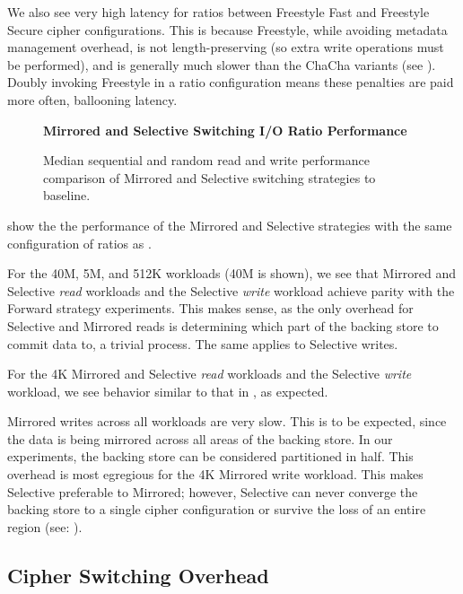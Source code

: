 We also see very high latency for ratios between Freestyle Fast and Freestyle
Secure cipher configurations. This is because Freestyle, while avoiding metadata
management overhead, is not length-preserving (so extra write operations must be
performed), and is generally much slower than the ChaCha variants (see
). Doubly invoking Freestyle in a ratio configuration
means these penalties are paid more often, ballooning latency.

\begin{figure}[ht]
  \textbf{Mirrored and Selective Switching I/O Ratio Performance}\par\medskip
  \centering
  {} \caption{Median sequential
  and random read and write performance comparison of Mirrored and Selective
  switching strategies to baseline.}
 \label{fig:mirrored-selective-baseline}
\end{figure}

 show the the performance of the Mirrored
and Selective strategies with the same configuration of ratios as
.

For the 40M, 5M, and 512K workloads (40M is shown), we see that Mirrored and
Selective \emph{read} workloads and the Selective \emph{write} workload achieve
parity with the Forward strategy experiments. This makes sense, as the only
overhead for Selective and Mirrored reads is determining which part of the
backing store to commit data to, a trivial process. The same applies to
Selective writes.

For the 4K Mirrored and Selective \emph{read} workloads and the Selective
\emph{write} workload, we see behavior similar to that in
, as expected.

Mirrored writes across all workloads are very slow. This is to be expected,
since the data is being mirrored across all areas of the backing store. In our
experiments, the backing store can be considered partitioned in half. This
overhead is most egregious for the 4K Mirrored write workload. This makes
Selective preferable to Mirrored; however, Selective can never converge the
backing store to a single cipher configuration or survive the loss of an entire
region (see: ).

\subsection{Cipher Switching Overhead}\label{subsec:3}

